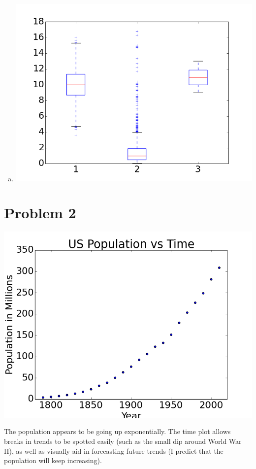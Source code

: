 \documentclass[11pt]{article}
\begin{document}
\begin{enumerate}[(a)]
\item {} {
	\includegraphics[scale = 0.5]{Boxplot.png}
	}

\end{enumerate}


\section*{Problem 2}

\includegraphics[scale = 0.5]{Figures/Timeplot.png}

The population appears to be going up exponentially. The time plot allows breaks in trends to be spotted easily (such as the small dip around World War II), as well as visually aid in forecasting future trends (I predict that the population will keep increasing).
\end{document}
